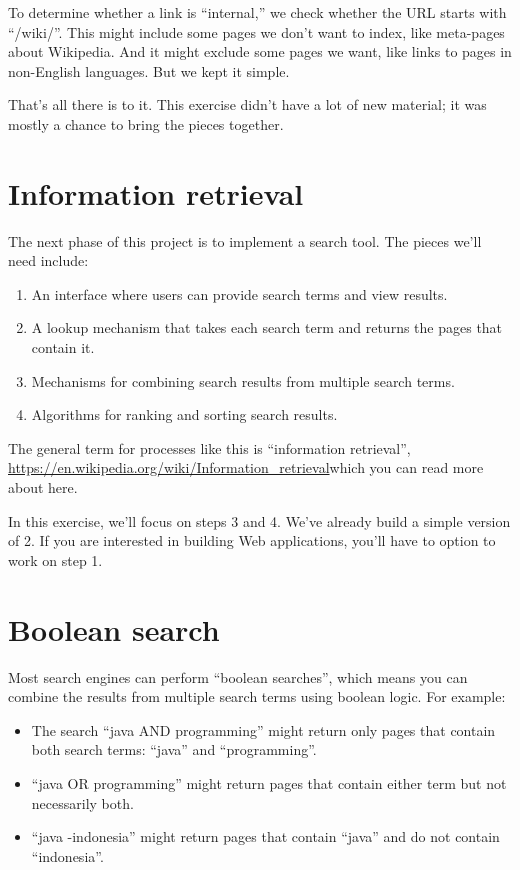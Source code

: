 \documentclass[12pt]{book}
\theoremstyle{exercise}
\begin{document}
{{{To determine whether a link is ``internal,'' we check whether the URL
starts with ``/wiki/''. This might include some pages we don't want to
index, like meta-pages about Wikipedia. And it might exclude some pages
we want, like links to pages in non-English languages. But we kept it
simple.

That's all there is to it. This exercise didn't have a lot of new material;
it was mostly a chance to bring the pieces together.

\section{Information retrieval}\label{information-retrieval}

The next phase of this project is to implement a search tool. The pieces
we'll need include:

\begin{enumerate}
\def\labelenumi{\arabic{enumi}.}
\item
  An interface where users can provide search terms and view results.
\item
  A lookup mechanism that takes each search term and returns the pages
  that contain it.
\item
  Mechanisms for combining search results from multiple search terms.
\item
  Algorithms for ranking and sorting search results.
\end{enumerate}

The general term for processes like this is ``information retrieval'',
\url{https://en.wikipedia.org/wiki/Information_retrieval}{which you can
read more about here}.

In this exercise, we'll focus on steps 3 and 4. We've already build a simple
version of 2. If you are interested in building Web applications, you'll
have to option to work on step 1.

\section{Boolean search}\label{boolean-search}

Most search engines can perform ``boolean searches'', which means you
can combine the results from multiple search terms using boolean logic.
For example:

\begin{itemize}
\item
  The search ``java AND programming'' might return only pages that
  contain both search terms: ``java'' and ``programming''.
\item
  ``java OR programming'' might return pages that contain either term
  but not necessarily both.
\item
  ``java -indonesia'' might return pages that contain ``java'' and do
  not contain ``indonesia''.
\end{itemize}

}}}
\end{document}

